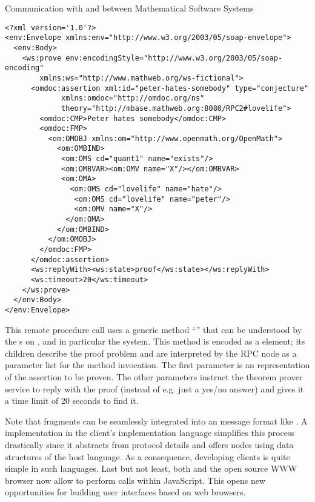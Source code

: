 \begin{tchapter}[id=rpc,short=Communication between Systems]{Communication with and between Mathematical Software Systems}
\begin{lstlisting}[label=lst:rpc-prover,
  caption={A {\soap} RPC call to {\spass}}]
<?xml version='1.0'?>
<env:Envelope xmlns:env="http://www.w3.org/2003/05/soap-envelope">
  <env:Body>
    <ws:prove env:encodingStyle="http://www.w3.org/2003/05/soap-encoding"
        xmlns:ws="http://www.mathweb.org/ws-fictional">
      <omdoc:assertion xml:id="peter-hates-somebody" type="conjecture"
             xmlns:omdoc="http://omdoc.org/ns"
             theory="http://mbase.mathweb.org:8080/RPC2#lovelife"> 
        <omdoc:CMP>Peter hates somebody</omdoc:CMP> 
        <omdoc:FMP> 
          <om:OMOBJ xmlns:om="http://www.openmath.org/OpenMath"> 
            <om:OMBIND> 
             <om:OMS cd="quant1" name="exists"/> 
             <om:OMBVAR><om:OMV name="X"/></om:OMBVAR> 
             <om:OMA> 
               <om:OMS cd="lovelife" name="hate"/> 
                <om:OMS cd="lovelife" name="peter"/> 
                <om:OMV name="X"/> 
              </om:OMA> 
            </om:OMBIND> 
          </om:OMOBJ> 
        </omdoc:FMP> 
      </omdoc:assertion> 
      <ws:replyWith><ws:state>proof</ws:state></ws:replyWith>
      <ws:timeout>20</ws:timeout>
    </ws:prove>
  </env:Body>
</env:Envelope>
\end{lstlisting}
This {\soap} remote procedure call uses a generic method ``{}'' that can be
understood by the {s} on {\mathwebsb}, and in
particular the {\spass} system. This method is encoded as a {}
element; its children describe the proof problem and are interpreted by the {\soap} RPC
node as a parameter list for the method invocation.  The first parameter is an {\omdoc}
representation of the assertion to be proven. The other parameters instruct the theorem
prover service to reply with the proof (instead of e.g. just a yes/no answer) and gives it
a time limit of 20 seconds to find it.

Note that {\omdoc} fragments can be seamlessly integrated into an {\xml} message format
like {\soap}. A {\soap} implementation in the client's implementation language simplifies
this process drastically since it abstracts from {\http} protocol details and offers
{\soap} nodes using data structures of the host language.  As a consequence, developing
{\mathweb} clients is quite simple in such languages.  Last but not least, both {\msie}
and the open source WWW browser {\firefox} now allow to perform {\soap} calls within
JavaScript. This opens new opportunities for building user interfaces based on web
browsers.


\end{tchapter}
